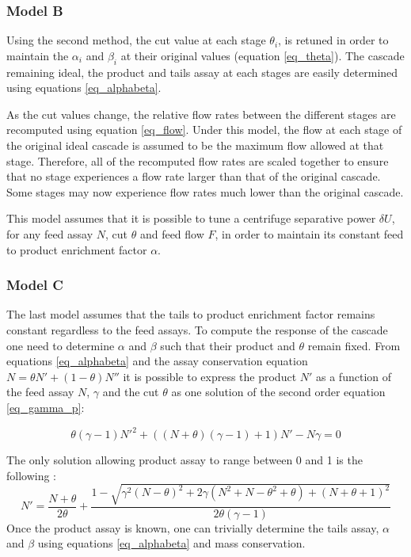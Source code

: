 \subsubsection{Model B}

Using the second method, the cut value at each stage $\theta_i$, is retuned in
order to maintain the $\alpha_i$ and $\beta_i$ at their original values
(equation \eqref{eq_theta}). The cascade remaining ideal, the product and tails
assay at each stages are easily determined using equations \eqref{eq_alphabeta}.

As the cut values change, the relative flow rates between the different stages
are recomputed using equation \eqref{eq_flow}.  Under this model, the flow at
each stage of the original ideal cascade is assumed to be the maximum flow
allowed at that stage.  Therefore, all of the recomputed flow rates are scaled
together to ensure that no stage experiences a flow rate larger than that of
the original cascade.  Some stages may now experience flow rates much lower
than the original cascade.


This model assumes that it is possible to tune a centrifuge separative power
$\delta U$, for any feed assay $N$, cut $\theta$ and feed flow $F$, in order to
maintain its constant feed to product enrichment factor $\alpha$.




\subsubsection{Model C}
The last model assumes that the tails to product enrichment factor remains
constant regardless to the feed assays. To compute the response of the cascade
one need to determine $\alpha$ and $\beta$ such that their product and
$\theta$ remain fixed.
From equations \eqref{eq_alphabeta} and the assay conservation equation $N =
\theta N' + (1-\theta)N''$ it is possible to express the product $N'$ as a function of
the feed assay $N$, $\gamma$ and the cut $\theta$ as one solution of the second
order equation \eqref{eq_gamma_p}:

\begin{equation}\label{eq_gamma_p}
    \theta(\gamma-1)N'^2+((N+\theta)(\gamma-1)+1)N'-N\gamma = 0
\end{equation}


The only solution allowing product assay to range between 0 and 1 is the
following :
\begin{equation}\label{eq_model_b_sol}
    N' = \frac{N+\theta}{2\theta} +
         \frac{1 - \sqrt{\gamma^{2}(N-\theta)^{2}
                         + 2\gamma( N^{2} + N - \theta^{2} + \theta)
                         + (N + \theta + 1)^{2}}}
              {2\theta(\gamma - 1)}
\end{equation}
Once the product assay is known, one can trivially determine the tails assay,
$\alpha$ and $\beta$ using equations \eqref{eq_alphabeta} and mass
conservation.

